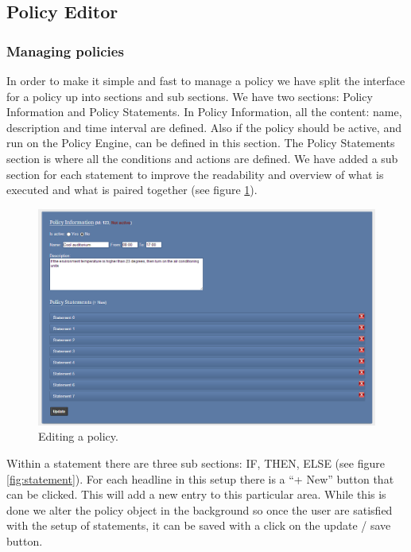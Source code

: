 \subsection{Policy Editor}

\subsubsection{Managing policies}
In order to make it simple and fast to manage a policy we have split the interface for a policy up into sections and sub sections. We have two sections: Policy Information and Policy Statements. In Policy Information, all the content: name, description and time interval are defined. Also if the policy should be active, and run on the Policy Engine, can be defined in this section. The Policy Statements section is where all the conditions and actions are defined. We have added a sub section for each statement to improve the readability and overview of what is executed and what is paired together (see figure \ref{fig:policy}).  

\begin{figure}[ht]
\centering
\includegraphics[width=\columnwidth]{policy.png}
\caption{Editing a policy.}
\label{fig:policy}
\end{figure}

Within a statement there are three sub sections: IF, THEN, ELSE (see figure \ref{fig:statement}). For each headline in this setup there is a "`+ New"' button that can be clicked. This will add a new entry to this particular area. While this is done we alter the policy object in the background so once the user are satisfied with the setup of statements, it can be saved with a click on the update / save button.

